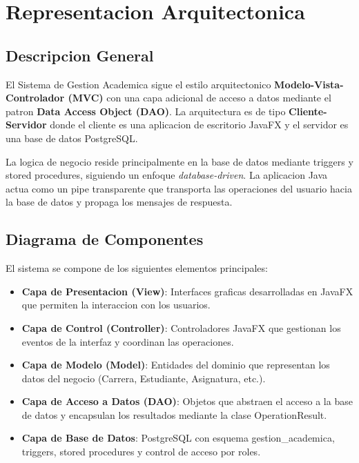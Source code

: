 \documentclass[12pt,a4paper]{article}
\begin{document}
\newpage
\section{Representacion Arquitectonica}

\subsection{Descripcion General}

El Sistema de Gestion Academica sigue el estilo arquitectonico \textbf{Modelo-Vista-Controlador (MVC)} con una capa adicional de acceso a datos mediante el patron \textbf{Data Access Object (DAO)}. La arquitectura es de tipo \textbf{Cliente-Servidor} donde el cliente es una aplicacion de escritorio JavaFX y el servidor es una base de datos PostgreSQL.

La logica de negocio reside principalmente en la base de datos mediante triggers y stored procedures, siguiendo un enfoque \textit{database-driven}. La aplicacion Java actua como un pipe transparente que transporta las operaciones del usuario hacia la base de datos y propaga los mensajes de respuesta.

\subsection{Diagrama de Componentes}

El sistema se compone de los siguientes elementos principales:

\begin{itemize}
    \item \textbf{Capa de Presentacion (View)}: Interfaces graficas desarrolladas en JavaFX que permiten la interaccion con los usuarios.
    \item \textbf{Capa de Control (Controller)}: Controladores JavaFX que gestionan los eventos de la interfaz y coordinan las operaciones.
    \item \textbf{Capa de Modelo (Model)}: Entidades del dominio que representan los datos del negocio (Carrera, Estudiante, Asignatura, etc.).
    \item \textbf{Capa de Acceso a Datos (DAO)}: Objetos que abstraen el acceso a la base de datos y encapsulan los resultados mediante la clase OperationResult.
    \item \textbf{Capa de Base de Datos}: PostgreSQL con esquema gestion\_academica, triggers, stored procedures y control de acceso por roles.
\end{itemize}
\end{document}
